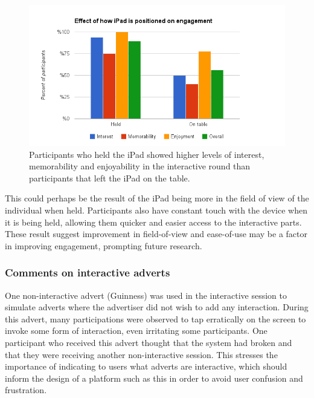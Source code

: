 	\begin{figure}[!ht]
		\centering
		\includegraphics[width=\textwidth]{images/ipad_held.png}
		\caption{Participants who held the iPad showed higher levels of interest, memorability and enjoyability in the interactive round than participants that left the iPad on the table.}
		\label{fig:held}
	\end{figure}

	This could perhaps be the result of the iPad being more in the field of view of the individual when held. Participants also have constant touch with the device when it is being held, allowing them quicker and easier access to the interactive parts. These result suggest improvement in field-of-view and ease-of-use may be a factor in improving engagement, prompting future research.
	

	\subsubsection{Comments on interactive adverts}

	One non-interactive advert (Guinness) was used in the interactive session to simulate adverts where the advertiser did not wish to add any interaction. During this advert, many participations were observed to tap erratically on the screen to invoke some form of interaction, even irritating some participants. One participant who received this advert thought that the system had broken and that they were receiving another non-interactive session. This stresses the importance of indicating to users what adverts are interactive, which should inform the design of a platform such as this in order to avoid user confusion and frustration.

